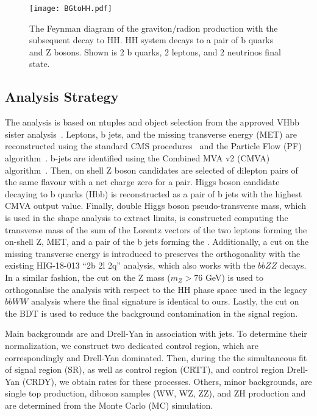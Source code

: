 \begin{figure}[!htb]%
  \begin{center}
    \texttt{[image: BGtoHH.pdf]}
    \caption{ The Feynman diagram of the graviton/radion production with the subsequent decay to HH. HH system decays to a pair of b quarks and Z bosons. Shown is 2 b quarks, 2 leptons, and 2 neutrinos final state.
    }
    \label{fig:BGtoHH}
  \end{center}
\end{figure}


\subsection{Analysis Strategy}

The analysis is based on ntuples and object selection from the approved VHbb sister analysis~\cite{VHbb_inspire}. Leptons, b jets, and the missing transverse energy (MET) are reconstructed using the standard CMS procedures~\cite{CMSreco} and the Particle Flow (PF) algorithm~\cite{PFalgo}. b-jets are identified using the Combined MVA v2 (CMVA) algorithm~\cite{BTagtwiki}. Then, on shell Z boson candidates are selected of dilepton pairs of the same flavour with a net charge zero for a pair. Higgs boson candidate decaying to b quarks (Hbb) is reconstructed as a pair of b jets with the highest CMVA output value. Finally, double Higgs boson pseudo-transverse mass, which is used in the shape analysis to extract limits, is constructed computing the transverse mass of the sum of the Lorentz vectors of the two leptons forming the on-shell Z, MET, and a pair of the b jets forming the \HBB. Additionally, a cut on the missing transverse energy is introduced to preserves the orthogonality with the existing HIG-18-013 ``2b 2l 2q'' analysis, which also works with the $bbZZ$ decays. In a similar fashion, the cut on the Z mass ($m_Z > 76$ GeV) is used to orthogonalise the analysis with respect to the HH phase space used in the legacy $bbWW$ analysis where the final signature is identical to ours. Lastly, the cut on the BDT is used to reduce the background contamination in the signal region.

Main backgrounds are \ttbar and Drell-Yan in association with jets. To determine their normalization, we construct two dedicated control region, which are correspondingly \ttbar and Drell-Yan dominated. Then, during the the simultaneous fit of signal region (SR), as well as control region \ttbar (CRTT), and control region Drell-Yan (CRDY), we obtain rates for these processes. Others, minor backgrounds, are single top production, diboson samples (WW, WZ, ZZ), and ZH production and are determined from the Monte Carlo (MC) simulation. 
